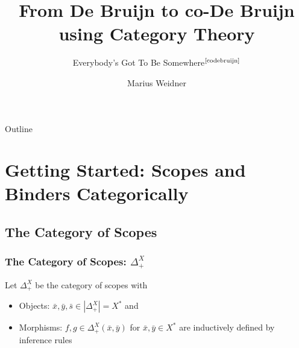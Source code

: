 \documentclass[aspectratio=169]{beamer}
\title{From De Bruijn to co-De Bruijn using Category Theory}
\subtitle{Everybody's Got To Be Somewhere$^{\text{\cite{codebruijn}}}$}
\institute[Uni Freiburg]{Chair of Programming Languages, University of
  Freiburg}
\author{Marius Weidner}
\theoremstyle{remarkstyle}
\begin{document}
\begin{frame}
  \titlepage{}
\end{frame}

\begin{frame}{Outline}
  \tableofcontents
\end{frame}

\section{Getting Started: Scopes and Binders Categorically}
\subsection{The Category of Scopes}

\begin{frame}[fragile]
  \frametitle{The Category of Scopes: $Δ_+^X$}
  \begin{definition}
    Let $Δ_+^X$ be the category of scopes with
    \begin{itemize}
      \item Objects: $\bar{x}, \bar{y}, \bar{s} ∈ |Δ_+^X| = X^*$ and
      \item Morphisms: $f, g ∈ Δ_+^X(\bar{x}, \bar{y})$ for $\bar{x}, \bar{y} ∈ X^*$ are inductively defined by inference rules
    \end{itemize}
    \begin{columns}
      \begin{column}{0.04\textwidth}
      \end{column}
      \begin{column}{0.2\textwidth}
        \begin{center}
        \end{center}
      \end{column}
      \begin{column}{0.2\textwidth}
        \begin{center}
        \end{center}
      \end{column}
      \begin{column}{0.2\textwidth}
        \begin{center}
        \end{center}
      \end{column}

\end{columns}
\end{definition}
\end{frame}
\end{document}

